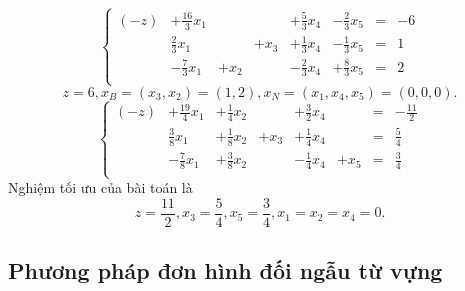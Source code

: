 \documentclass[12pt,a4paper]{report}
\begin{document}
\begin{equation*}
    \left\{\begin{array}{cccccccc}
    (-z) &+\frac{16}{3}x_1 &&&+\frac{5}{3}x_4&-\frac{2}{3} x_5 &=& -6 \\
    &\frac{2}{3}x_1 &&+ x_3 &+ \frac{1}{3}x_4 &-\frac{1}{3} x_5 &=& 1 \\
    &-\frac{7}{3}x_1 &+ x_2 & &-\frac{2}{3}x_4&+\frac{8}{3}x_5 &=& 2 \\
    \end{array}\right.
\end{equation*}
\begin{equation*}
z=6, x_B=(x_3,x_2)=(1,2), x_N=(x_1,x_4,x_5)=(0,0,0).
\end{equation*}
\begin{equation*}
    \left\{\begin{array}{cccccccc}
    (-z) &+\frac{19}{4}x_1 &+\frac{1}{4}x_2&&+\frac{3}{2}x_4&&=& -\frac{11}{2} \\
    &\frac{3}{8}x_1 &+\frac{1}{8}x_2&+x_3 &+\frac{1}{4}x_4 &&=& \frac{5}{4} \\
    &-\frac{7}{8}x_1 &+ \frac{3}{8}x_2 &&-\frac{1}{4}x_4&+x_5 &=& \frac{3}{4} \\
    \end{array}\right.
\end{equation*}
Nghiệm tối ưu của bài toán là
\begin{equation*}
z=\frac{11}{2}, x_3=\frac{5}{4}, x_5=\frac{3}{4}, x_1=x_2=x_4=0.
\end{equation*}

\subsection{Phương pháp đơn hình đối ngẫu từ vựng}
\end{document}
